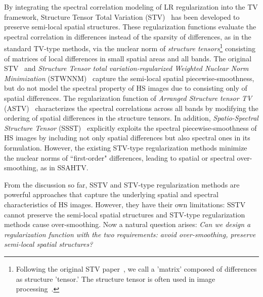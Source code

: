 By integrating the spectral correlation modeling of LR regularization into the TV framework, Structure Tensor Total Variation (STV)~\cite{Lefkimmiatis2015STV, Wu2017STWNNM, Ono2016ASTV, Kurihara2017SSST} has been developed to preserve semi-local spatial structures. These regularization functions evaluate the spectral correlation in differences instead of the sparsity of differences, as in the standard TV-type methods, via the nuclear norm of \textit{structure tensors}\footnote{Following the original STV paper~\cite{Lefkimmiatis2015STV}, we call a 'matrix' composed of differences as structure 'tensor.' The structure tensor is often used in image processing~\cite{Forstner1987Fast, Weickert1998Anisotropic, Jahne2005Digital}.} consisting of matrices of local differences in small spatial areas and all bands. The original STV~\cite{Lefkimmiatis2015STV} and \textit{Structure Tensor total variation-regularized Weighted Nuclear Norm Minimization} (STWNNM)~\cite{Wu2017STWNNM} capture the semi-local spatial piecewise-smoothness, but do not model the spectral property of HS images due to consisting only of spatial differences. The regularization function of \textit{Arranged Structure tensor TV} (ASTV)~\cite{Ono2016ASTV} characterizes the spectral correlations across all bands by modifying the ordering of spatial differences in the structure tensors. In addition, \textit{Spatio-Spectral Structure Tensor} (SSST)~\cite{Kurihara2017SSST} explicitly exploits the spectral piecewise-smoothness of HS images by including not only spatial differences but also spectral ones in its formulation. However, the existing STV-type regularization methods minimize the nuclear norms of “first-order" differences, leading to spatial or spectral over-smoothing, as in SSAHTV.

 
From the discussion so far, SSTV and STV-type regularization methods are powerful approaches that capture the underlying spatial and spectral characteristics of HS images.
However, they have their own limitations: SSTV cannot preserve the semi-local spatial structures and STV-type regularization methods cause over-smoothing.
Now a natural question arises: \textit{Can we design a regularization function with the two requirements: avoid over-smoothing, preserve semi-local spatial structures?} 


